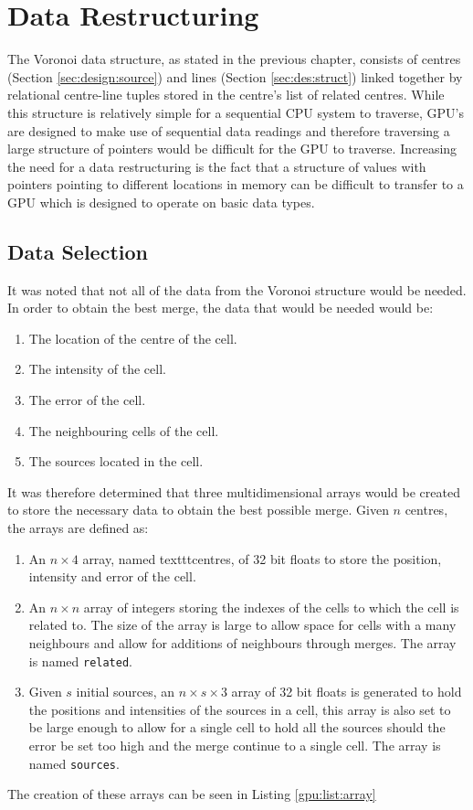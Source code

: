 \section{Data Restructuring}
The Voronoi data structure, as stated in the previous chapter, consists of centres (Section \ref{sec:design:source}) and lines (Section \ref{sec:des:struct}) linked together by relational centre-line tuples stored in the centre's  list of related centres. While this structure is relatively simple for a sequential CPU system to traverse, GPU's are designed to make use of sequential data readings and therefore traversing a large structure of pointers would be difficult for the GPU to traverse. Increasing the need for a data restructuring is the fact that a structure of values with pointers pointing to different locations in memory can be difficult to transfer to a GPU which is designed to operate on basic data types.
\subsection{Data Selection}
It was noted that not all of the data from the Voronoi structure would be needed. In order to obtain the best merge, the data that would be needed would be:
\begin{enumerate}
\item The location of the centre of the cell.
\item The intensity of the cell.
\item The error of the cell.
\item The neighbouring cells of the cell.
\item The sources located in the cell.
\end{enumerate}
It was therefore determined that three multidimensional arrays would be created to store the necessary data to obtain the best possible merge. Given $n$ centres, the arrays are defined as:
\begin{enumerate}
\item An $n \times 4$ array, named texttt{centres}, of 32 bit floats to store the position, intensity and error of the cell.
\item An $n \times n$ array of integers storing the indexes of the cells to which the cell is related to. The size of the array is large to allow space for cells with a many neighbours and allow for additions of neighbours through merges. The array is named \texttt{related}.
\item Given $s$ initial sources, an $n \times s \times 3$ array of 32 bit floats is generated to hold the positions and intensities of the sources in a cell, this array is also set to be large enough to allow for a single cell to hold all the sources should the error be set too high and the merge continue to a single cell. The array is named \texttt{sources}.
\end{enumerate}
The creation of these arrays can be seen in Listing \ref{gpu:list:array}

